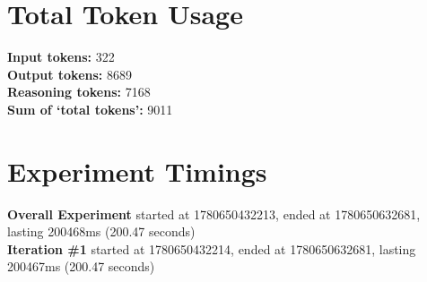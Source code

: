 \documentclass{article}
\begin{document}
\section*{Total Token Usage}
\textbf{Input tokens: }322
\\\textbf{Output tokens: }8689
\\\textbf{Reasoning tokens: }7168
\\\textbf{Sum of `total tokens': }9011
\section*{Experiment Timings}
\textbf{Overall Experiment} started at 1780650432213, ended at 1780650632681, lasting 200468ms (200.47 seconds)
\\\textbf{Iteration \#1} started at 1780650432214, ended at 1780650632681, lasting 200467ms (200.47 seconds)
\end{document}
